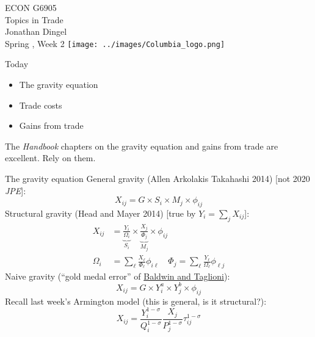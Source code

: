 \documentclass[10pt,notes=hide,aspectratio=169]{beamer}
\begin{document}
\begin{frame}[plain]
\begin{center}
\large
\textcolor{columbiadarkblue}{ECON G6905\\
Topics in Trade\\ 
Jonathan Dingel\\
Spring \the\year, Week 2}
\vfill 
\texttt{[image: ../images/Columbia\_logo.png]}
\end{center}
\end{frame}
\begin{frame}{Today}
\begin{itemize}
	\item The gravity equation
	\item Trade costs
	\item Gains from trade
\end{itemize}
The \textit{Handbook} chapters on the gravity equation and gains from trade are excellent.
Rely on them.
\end{frame}
\begin{frame}{The gravity equation}
General gravity (Allen Arkolakis Takahashi 2014) [not 2020 \textit{JPE}]:
\begin{equation*}
X_{ij} = G \times S_i \times M_j \times \phi_{ij}
\end{equation*}
Structural gravity (Head and Mayer 2014) [true by $Y_i = \sum_j X_{ij}$]:
\begin{align*}
X_{ij} &= \underbrace{\frac{Y_i}{\Omega_i}}_{S_i} \times \underbrace{\frac{X_j}{\Phi_j}}_{M_j} \times \phi_{ij}\\
\Omega_i &= \sum_{\ell} \frac{X_{\ell}}{\Phi_{\ell}} \phi_{i \ell}
\quad 
\Phi_j  = \sum_{\ell} \frac{Y_{\ell}}{\Omega_{\ell}} \phi_{\ell j}
\end{align*}
Naive gravity (``gold medal error'' of \href{https://www.nber.org/papers/w12516}{Baldwin and Taglioni}):
\begin{equation*}
X_{ij} = G \times Y_i^a \times Y_j^b \times \phi_{ij}
\end{equation*}
Recall last week's Armington model (this is general, is it structural?):
\begin{equation*}
X_{ij}	= \frac{Y_i^{1-\sigma}}{Q_i^{1-\sigma}} \frac{X_j}{P_j^{1-\sigma}}\tau_{ij}^{1-\sigma}
\end{equation*}
\end{frame}
\end{document}
